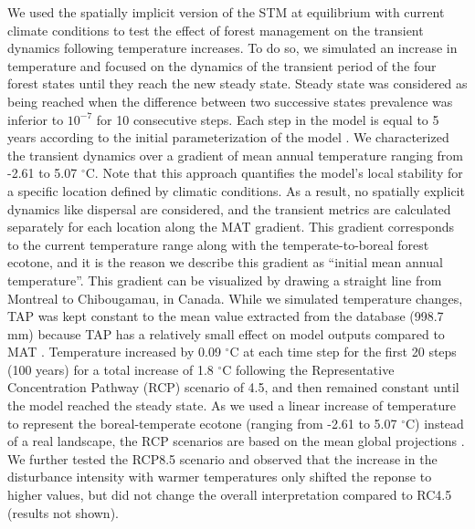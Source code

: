 We used the spatially implicit version of the STM at equilibrium with
current climate conditions to test the effect of forest management on
the transient dynamics following temperature increases. To do so, we
simulated an increase in temperature and focused on the dynamics of the
transient period of the four forest states until they reach the new
steady state. Steady state was considered as being reached when the
difference between two successive states prevalence was inferior to
\(10^{-7}\) for 10 consecutive steps. Each step in the model is equal to
5 years according to the initial parameterization of the model
\citep{Vissault2020}. We characterized the transient dynamics over a
gradient of mean annual temperature ranging from -2.61 to 5.07
\(^{\circ}\)C. Note that this approach quantifies the model's local
stability for a specific location defined by climatic conditions. As a
result, no spatially explicit dynamics like dispersal are considered,
and the transient metrics are calculated separately for each location
along the MAT gradient. This gradient corresponds to the current
temperature range along with the temperate-to-boreal forest ecotone, and
it is the reason we describe this gradient as ``initial mean annual
temperature''. This gradient can be visualized by drawing a straight
line from Montreal to Chibougamau, in Canada. While we simulated
temperature changes, TAP was kept constant to the mean value extracted
from the database (998.7 mm) because TAP has a relatively small effect
on model outputs compared to MAT \citep{Vissault2020}. Temperature
increased by 0.09 \(^{\circ}\)C at each time step for the first 20 steps
(100 years) for a total increase of 1.8 \(^{\circ}\)C following the
Representative Concentration Pathway (RCP) scenario of 4.5, and then
remained constant until the model reached the steady state. As we used a
linear increase of temperature to represent the boreal-temperate ecotone
(ranging from -2.61 to 5.07 \(^{\circ}\)C) instead of a real landscape,
the RCP scenarios are based on the mean global projections
\citep{IPCC2013}. We further tested the RCP8.5 scenario and observed
that the increase in the disturbance intensity with warmer temperatures
only shifted the reponse to higher values, but did not change the
overall interpretation compared to RC4.5 (results not shown).

